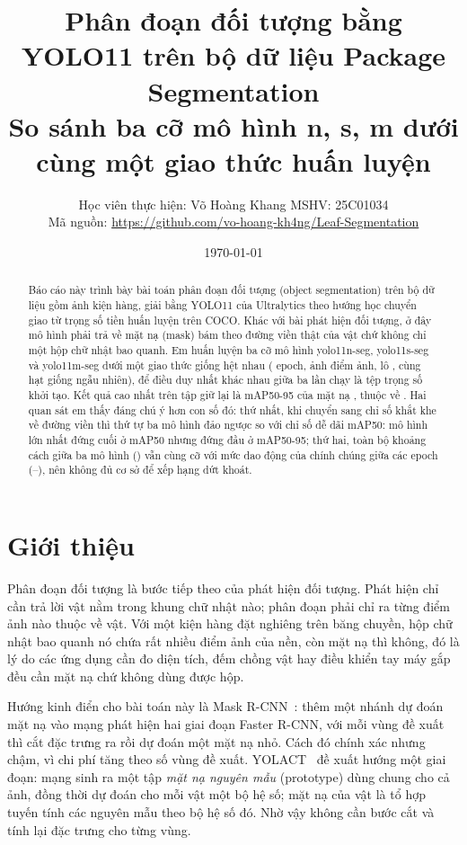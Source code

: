 \documentclass[11pt,a4paper]{article}
\title{\vspace{-1.5cm}Phân đoạn đối tượng bằng YOLO11 trên bộ dữ liệu Package Segmentation\\
\large So sánh ba cỡ mô hình n, s, m dưới cùng một giao thức huấn luyện}
\author{Học viên thực hiện: Võ Hoàng Khang \quad MSHV: 25C01034\\[0.3em]
\small Mã nguồn: \url{https://github.com/vo-hoang-kh4ng/Leaf-Segmentation}}
\date{\today}
\begin{document}
\maketitle
\vspace{-0.8cm}

\begin{abstract}
\noindent
Báo cáo này trình bày bài toán phân đoạn đối tượng (object segmentation) trên bộ dữ liệu
\dataname{} gồm \ntotal{} ảnh kiện hàng, giải bằng YOLO11 của Ultralytics theo hướng học chuyển
giao từ trọng số tiền huấn luyện trên COCO. Khác với bài phát hiện đối tượng, ở đây mô hình phải
trả về mặt nạ (mask) bám theo đường viền thật của vật chứ không chỉ một hộp chữ nhật bao quanh. Em
huấn luyện ba cỡ mô hình yolo11n-seg, yolo11s-seg và yolo11m-seg dưới một giao thức giống hệt nhau
(\epochs{} epoch, ảnh \imgsz{} điểm ảnh, lô \batch{}, cùng hạt giống ngẫu nhiên), để điều duy
nhất khác nhau giữa ba lần chạy là tệp trọng số khởi tạo. Kết quả cao nhất trên tập giữ lại là
mAP50-95 của mặt nạ \besttestmap{}, thuộc về \besttest{}. Hai quan sát em thấy đáng chú ý hơn con
số đó: thứ nhất, khi chuyển sang chỉ số khắt khe về đường viền thì thứ tự ba mô hình đảo ngược so
với chỉ số dễ dãi mAP50: mô hình lớn nhất đứng cuối ở mAP50 nhưng đứng đầu ở mAP50-95; thứ hai,
toàn bộ khoảng cách giữa ba mô hình (\testspread{}) vẫn cùng cỡ với mức dao động của chính chúng
giữa các epoch (\minstd{}--\maxstd{}), nên không đủ cơ sở để xếp hạng dứt khoát.
\end{abstract}

\section{Giới thiệu}

Phân đoạn đối tượng là bước tiếp theo của phát hiện đối tượng. Phát hiện chỉ cần trả lời vật nằm
trong khung chữ nhật nào; phân đoạn phải chỉ ra từng điểm ảnh nào thuộc về vật. Với một kiện hàng
đặt nghiêng trên băng chuyền, hộp chữ nhật bao quanh nó chứa rất nhiều điểm ảnh của nền, còn mặt nạ
thì không, đó là lý do các ứng dụng cần đo diện tích, đếm chồng vật hay điều khiển tay máy gắp
đều cần mặt nạ chứ không dùng được hộp.

Hướng kinh điển cho bài toán này là Mask R-CNN~\cite{he2017}: thêm một nhánh dự đoán mặt nạ vào
mạng phát hiện hai giai đoạn Faster R-CNN, với mỗi vùng đề xuất thì cắt đặc trưng ra rồi dự đoán
một mặt nạ nhỏ. Cách đó chính xác nhưng chậm, vì chi phí tăng theo số vùng đề xuất.
YOLACT~\cite{bolya2019} đề xuất hướng một giai đoạn: mạng sinh ra một tập \emph{mặt nạ nguyên mẫu}
(prototype) dùng chung cho cả ảnh, đồng thời dự đoán cho mỗi vật một bộ hệ số; mặt nạ của vật là tổ
hợp tuyến tính các nguyên mẫu theo bộ hệ số đó. Nhờ vậy không cần bước cắt và tính lại đặc trưng
cho từng vùng.
\end{document}

